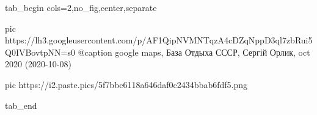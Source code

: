  
 
 
 
 


\ifcmt
  tab_begin cols=2,no_fig,center,separate

		 pic https://lh3.googleusercontent.com/p/AF1QipNVMNTqzA4cDZqNppD3ql7zbRui5Q0IVBovtpNN=s0
		 @caption google maps, База Отдыха СССР, Сергій Орлик, oct 2020 (2020-10-08)

		 pic https://i2.paste.pics/5f7bbc6118a646daf0c2434bbab6fdf5.png

  tab_end
\fi
